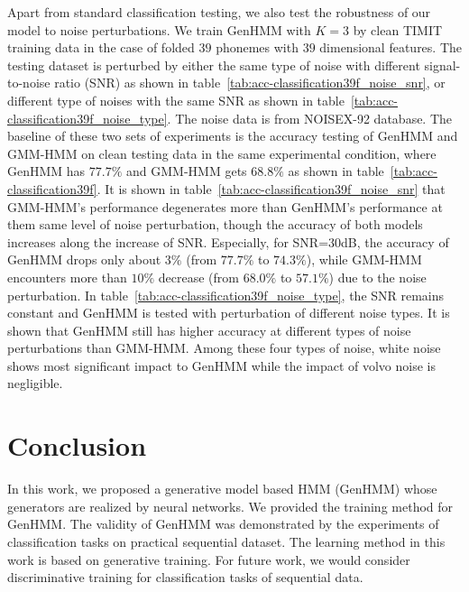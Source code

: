 \documentclass[letterpaper]{article} %
\begin{document}
Apart from standard classification testing, we also test the robustness of our model to noise perturbations. We train GenHMM with $K=3$ by clean TIMIT training data in the case of folded $39$ phonemes with $39$ dimensional features. The testing dataset is perturbed by either the same type of noise with different signal-to-noise ratio (SNR) as shown in table~\ref{tab:acc-classification39f_noise_snr}, or different type of noises with the same SNR as shown in table~\ref{tab:acc-classification39f_noise_type}. The noise data is from NOISEX-92 database. The baseline of these two sets of experiments is the accuracy testing of GenHMM and GMM-HMM on clean testing data in the same experimental condition, where GenHMM has $77.7\%$ and GMM-HMM gets $68.8\%$ as shown in table~\ref{tab:acc-classification39f}. It is shown in table~\ref{tab:acc-classification39f_noise_snr} that GMM-HMM's performance degenerates more than GenHMM's performance at them same level of noise perturbation, though the accuracy of both models increases along the increase of SNR. Especially, for SNR=$30$dB, the accuracy of GenHMM drops only about $3\%$ (from $77.7\%$ to $74.3\%$), while GMM-HMM encounters more than $10\%$ decrease (from $68.0\%$ to $57.1\%$) due to the noise perturbation. In table~\ref{tab:acc-classification39f_noise_type}, the SNR remains constant and GenHMM is tested with perturbation of different noise types. It is shown that GenHMM still has higher accuracy at different types of noise perturbations than GMM-HMM. Among these four types of noise, white noise shows most significant impact to GenHMM while the impact of volvo noise is negligible.


\section{Conclusion}
In this work, we proposed a generative model based HMM (GenHMM) whose generators are realized by neural networks. We provided the training method for GenHMM. The validity of GenHMM was demonstrated by the experiments of classification tasks on practical sequential dataset. The learning method in this work is based on generative training. For future work, we would consider discriminative training for classification tasks of sequential data.




\end{document}
